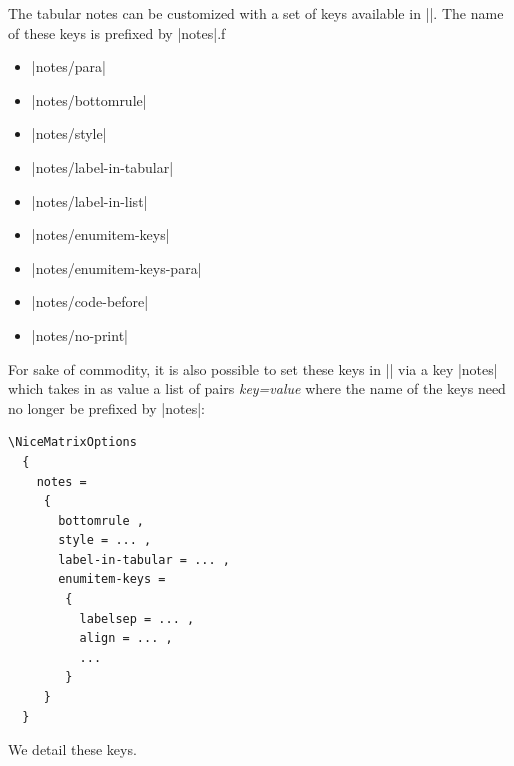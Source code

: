 \documentclass[dvipsnames]{article}
\begin{document}
The tabular notes can be customized with a set of keys available in
|\NiceMatrixOptions|. The name of these keys is prefixed by |notes|.f
\begin{itemize}[beginpenalty=10000]
\item |notes/para| 
\item |notes/bottomrule| 
\item |notes/style| 
\item |notes/label-in-tabular| 
\item |notes/label-in-list| 
\item |notes/enumitem-keys| 
\item |notes/enumitem-keys-para| 
\item |notes/code-before|
\item |notes/no-print|
\end{itemize}
For sake of commodity, it is also possible to set these keys in
|\NiceMatrixOptions| via a key |notes| which takes in as value a list of 
pairs \textsl{key=value} where the name of the keys need no longer be
prefixed by |notes|:
\begin{center}
\small
\begin{BVerbatim}
\NiceMatrixOptions
  {
    notes = 
     {
       bottomrule ,
       style = ... ,
       label-in-tabular = ... ,
       enumitem-keys = 
        {
          labelsep = ... ,
          align = ... ,
          ...
        }
     }
  }
\end{BVerbatim}
\end{center}


\bigskip
We detail these keys.
\end{document}
